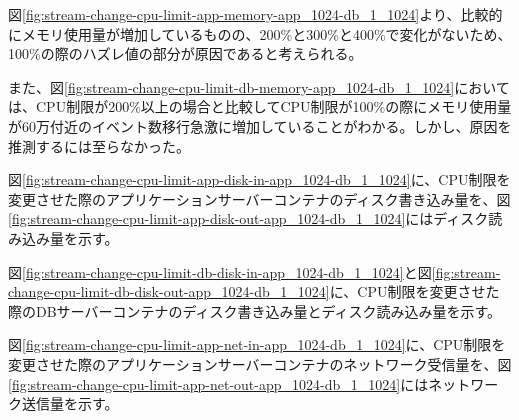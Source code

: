 \documentclass[../../../../main]{subfiles}
\begin{document}
    

    図\ref{fig:stream-change-cpu-limit-app-memory-app_1024-db_1_1024}より、比較的にメモリ使用量が増加しているものの、200\%と300\%と400\%で変化がないため、100\%の際のハズレ値の部分が原因であると考えられる。

    また、図\ref{fig:stream-change-cpu-limit-db-memory-app_1024-db_1_1024}においては、CPU制限が200\%以上の場合と比較してCPU制限が100\%の際にメモリ使用量が60万付近のイベント数移行急激に増加していることがわかる。しかし、原因を推測するには至らなかった。


    図\ref{fig:stream-change-cpu-limit-app-disk-in-app_1024-db_1_1024}に、CPU制限を変更させた際のアプリケーションサーバーコンテナのディスク書き込み量を、図\ref{fig:stream-change-cpu-limit-app-disk-out-app_1024-db_1_1024}にはディスク読み込み量を示す。

    
    

    図\ref{fig:stream-change-cpu-limit-db-disk-in-app_1024-db_1_1024}と図\ref{fig:stream-change-cpu-limit-db-disk-out-app_1024-db_1_1024}に、CPU制限を変更させた際のDBサーバーコンテナのディスク書き込み量とディスク読み込み量を示す。

    
    


    図\ref{fig:stream-change-cpu-limit-app-net-in-app_1024-db_1_1024}に、CPU制限を変更させた際のアプリケーションサーバーコンテナのネットワーク受信量を、図\ref{fig:stream-change-cpu-limit-app-net-out-app_1024-db_1_1024}にはネットワーク送信量を示す。

    
    
\end{document}
